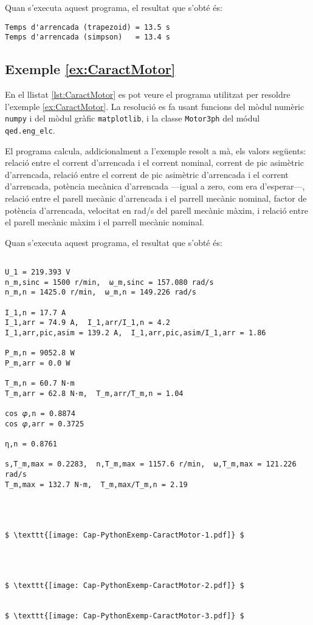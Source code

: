 Quan s'executa aquest programa, el resultat que s'obté és:
\lstset{
	language=,
	numbers=none,
	frame=none
}
\begin{lstlisting}
Temps d'arrencada (trapezoid) = 13.5 s
Temps d'arrencada (simpson)   = 13.4 s
\end{lstlisting} 


\hypertarget{exemple:CaractMotor}{\subsection{Exemple \ref*{ex:CaractMotor} \CaractMotor}}
En el llistat \vref{lst:CaractMotor} es pot veure el programa utilitzat per resoldre l'exemple \vref{ex:CaractMotor}. La resolució es fa usant funcions del mòdul numèric \texttt{numpy} i del mòdul gràfic \texttt{matplotlib}, i la classe \texttt{Motor3ph} del módul \texttt{qed.eng\_elc}. 


El programa calcula, addicionalment a l'exemple resolt a mà, els valors següents:
relació entre el corrent d'arrencada i el corrent nominal, 
corrent de pic asimètric d'arrencada,
relació entre el corrent de pic asimètric d'arrencada i el corrent d'arrencada,
potència mecànica d'arrencada ---igual a zero, com era d'esperar---,
relació entre el parell mecànic d'arrencada i el parrell mecànic nominal,
factor de potència d'arrencada,
velocitat en rad/s del parell mecànic màxim, i
relació entre el parell mecànic màxim i el parrell mecànic nominal.


Quan s'executa aquest programa, el resultat que s'obté és:
\lstset{
	language=,
	numbers=none,
	frame=none
}

\begin{lstlisting}[mathescape=true]
	
U_1 = 219.393 V
n_m,sinc = 1500 r/min,  ω_m,sinc = 157.080 rad/s
n_m,n = 1425.0 r/min,  ω_m,n = 149.226 rad/s

I_1,n = 17.7 A
I_1,arr = 74.9 A,  I_1,arr/I_1,n = 4.2
I_1,arr,pic,asim = 139.2 A,  I_1,arr,pic,asim/I_1,arr = 1.86

P_m,n = 9052.8 W
P_m,arr = 0.0 W

T_m,n = 60.7 N·m
T_m,arr = 62.8 N·m,  T_m,arr/T_m,n = 1.04

cos 𝜑,n = 0.8874
cos 𝜑,arr = 0.3725

η,n = 0.8761

s,T_m,max = 0.2283,  n,T_m,max = 1157.6 r/min,  ω,T_m,max = 121.226 rad/s
T_m,max = 132.7 N·m,  T_m,max/T_m,n = 2.19




$ \texttt{[image: Cap-PythonExemp-CaractMotor-1.pdf]} $
    
    
    
    
$ \texttt{[image: Cap-PythonExemp-CaractMotor-2.pdf]} $


$ \texttt{[image: Cap-PythonExemp-CaractMotor-3.pdf]} $
\end{lstlisting} 






